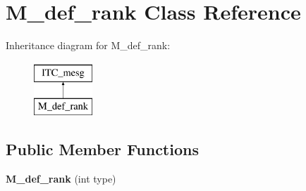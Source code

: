 \hypertarget{class_m__def__rank}{}\section{M\+\_\+def\+\_\+rank Class Reference}
\label{class_m__def__rank}
Inheritance diagram for M\+\_\+def\+\_\+rank\+:\begin{figure}[H]
\begin{center}
\leavevmode
\includegraphics[height=2.000000cm]{class_m__def__rank}
\end{center}
\end{figure}
\subsection*{Public Member Functions}
\begin{DoxyCompactItemize}
\item 
\mbox{\label{class_m__def__rank_a1977a2a65e6f70c1aa61460625d79585}} 
{\bfseries M\+\_\+def\+\_\+rank} (int type)
\end{DoxyCompactItemize}
